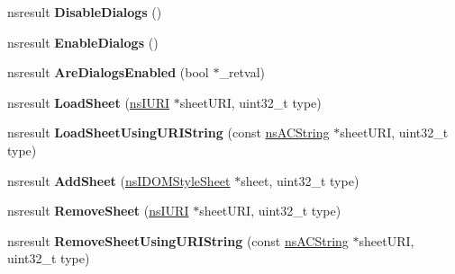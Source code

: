 \begin{DoxyCompactItemize}
\item 
\mbox{\label{interfacens_i_d_o_m_window_utils_ac7ce128b2a57a8f71e0ed4a0ebae9993}} 
nsresult {\bfseries Disable\+Dialogs} ()
\item 
\mbox{\label{interfacens_i_d_o_m_window_utils_af0c627fe31ec020c6e156eb84dbc1e36}} 
nsresult {\bfseries Enable\+Dialogs} ()
\item 
\mbox{\label{interfacens_i_d_o_m_window_utils_af485394ab1f6ec5362c9d0ba5cf4afc4}} 
nsresult {\bfseries Are\+Dialogs\+Enabled} (bool $\ast$\+\_\+retval)
\item 
\mbox{\label{interfacens_i_d_o_m_window_utils_a6b05cbeb2712bfd72dc589323c42ec5c}} 
nsresult {\bfseries Load\+Sheet} (\hyperlink{interfacens_i_u_r_i}{ns\+I\+U\+RI} $\ast$sheet\+U\+RI, uint32\+\_\+t type)
\item 
\mbox{\label{interfacens_i_d_o_m_window_utils_ae801cc724bfd2386729b1a142b07dba6}} 
nsresult {\bfseries Load\+Sheet\+Using\+U\+R\+I\+String} (const \hyperlink{structns_c_string_container}{ns\+A\+C\+String} $\ast$sheet\+U\+RI, uint32\+\_\+t type)
\item 
\mbox{\label{interfacens_i_d_o_m_window_utils_a894ea2c07804b5817ed000df74128cd2}} 
nsresult {\bfseries Add\+Sheet} (\hyperlink{interfacens_i_d_o_m_style_sheet}{ns\+I\+D\+O\+M\+Style\+Sheet} $\ast$sheet, uint32\+\_\+t type)
\item 
\mbox{\label{interfacens_i_d_o_m_window_utils_abf39a81d6f1edc13554bf94c413caf48}} 
nsresult {\bfseries Remove\+Sheet} (\hyperlink{interfacens_i_u_r_i}{ns\+I\+U\+RI} $\ast$sheet\+U\+RI, uint32\+\_\+t type)
\item 
\mbox{\label{interfacens_i_d_o_m_window_utils_aaababb641ab5756e8a168742afc6a5f6}} 
nsresult {\bfseries Remove\+Sheet\+Using\+U\+R\+I\+String} (const \hyperlink{structns_c_string_container}{ns\+A\+C\+String} $\ast$sheet\+U\+RI, uint32\+\_\+t type)
\item 
\mbox{\label{interfacens_i_d_o_m_window_utils_a62a5145e14641534de158fb5413f3765}} 

\end{DoxyCompactItemize}

